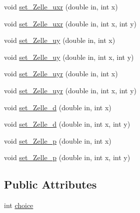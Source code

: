 \begin{DoxyCompactItemize}
\item 
void \hyperlink{classRaster_a2b6085833aa2c13cb33f4313808f6504}{set\-\_\-\-Zelle\-\_\-uxr} (double in, int x)
\item 
void \hyperlink{classRaster_a493fd13cf5bfc008ea29728293cf7373}{set\-\_\-\-Zelle\-\_\-uxr} (double in, int x, int y)
\item 
void \hyperlink{classRaster_a6000e3eecad5f12660dea30337b53411}{set\-\_\-\-Zelle\-\_\-uy} (double in, int x)
\item 
void \hyperlink{classRaster_ae8c69cf6cd00117f896601270d348416}{set\-\_\-\-Zelle\-\_\-uy} (double in, int x, int y)
\item 
void \hyperlink{classRaster_a95368c497947ebc73ed317c905d4abce}{set\-\_\-\-Zelle\-\_\-uyr} (double in, int x)
\item 
void \hyperlink{classRaster_a9aa9233a3644c3239679c39f9a3e14ed}{set\-\_\-\-Zelle\-\_\-uyr} (double in, int x, int y)
\item 
void \hyperlink{classRaster_a8f526fa84e3593c504d4fa9a9e19b2da}{set\-\_\-\-Zelle\-\_\-d} (double in, int x)
\item 
void \hyperlink{classRaster_a13de1d5c259fc17dd42b2f33d5461ac2}{set\-\_\-\-Zelle\-\_\-d} (double in, int x, int y)
\item 
void \hyperlink{classRaster_af1263a6f61dde08c5173a55fe832ea69}{set\-\_\-\-Zelle\-\_\-p} (double in, int x)
\item 
void \hyperlink{classRaster_a15f4c665d91aa2441f6da1274b7ebb88}{set\-\_\-\-Zelle\-\_\-p} (double in, int x, int y)
\end{DoxyCompactItemize}
\subsection*{Public Attributes}
\begin{DoxyCompactItemize}
\item 
int \hyperlink{classRaster_a3ee80791433ead17e651ba9a67b21fe9}{choice}
\end{DoxyCompactItemize}
